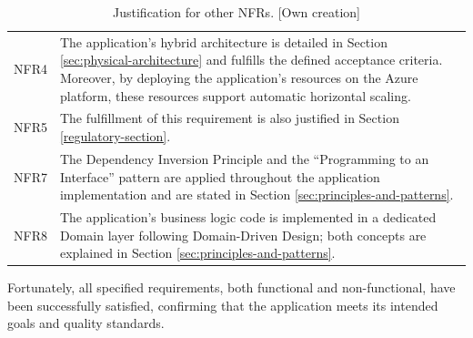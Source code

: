 \begin{table}[H]
\begin{tabularx}{\textwidth}{
        >{\centering\arraybackslash}p{1.5cm}
        >{\arraybackslash}p{14.5cm}
    }
        \rowcolor{gray!05}
        NFR4 &
        The application's hybrid architecture is detailed in Section \ref{sec:physical-architecture} and fulfills the defined acceptance criteria. Moreover, by deploying the application's resources on the Azure platform, these resources support automatic horizontal scaling. \\

        \rowcolor{gray!05}
        NFR5 &
        The fulfillment of this requirement is also justified in Section \ref{regulatory-section}. \\

        \rowcolor{gray!05}
        NFR7 &
        The Dependency Inversion Principle and the “Programming to an Interface” pattern are applied throughout the application implementation and are stated in Section \ref{sec:principles-and-patterns}. \\

        \rowcolor{gray!05}
        NFR8 &
        The application's business logic code is implemented in a dedicated Domain layer following Domain-Driven Design; both concepts are explained in Section \ref{sec:principles-and-patterns}. \\
    \end{tabularx}

    \caption[Justification for other NFRs]
    {Justification for other NFRs. [Own creation]}
    \vspace{-1em}
    \label{table:other-nfr-justification}
\end{table}



Fortunately, all specified requirements, both functional and non-functional, have been successfully satisfied, confirming that the application meets its intended goals and quality standards.



